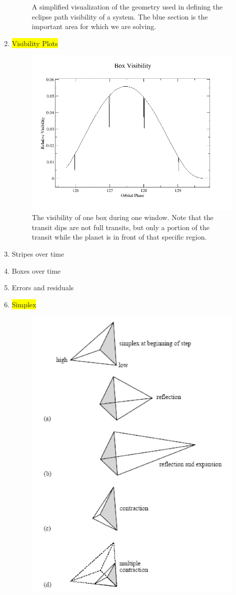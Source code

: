 \documentclass[iop]{emulateapj}
\newcommand{\hilight}[1]{\colorbox{yellow}{#1}}
\begin{document}
\begin{enumerate}
\begin{figure}[h]
				\caption{A simplified visualization of the geometry used in defining the eclipse path visibility of a system. The blue section is the important area for which we are solving.}
				\label{eclipse}
			\end{figure}
		\item \hilight{Visibility Plots}
			\begin{figure}[h]
				\centering
				\includegraphics[width=.5\textwidth]{images/box_vis.png}
				\caption{The visibility of one box during one window. Note that the transit dips are not full transits, but only a portion of the transit while the planet is in front of that specific region.}
				\label{box}
			\end{figure}
		\item Stripes over time
		\item Boxes over time
		\item Errors and residuals
		\item  \hilight{Simplex}
			\begin{figure}[h]
				\centering
				\includegraphics[width=.5\textwidth]{images/simplex.png}

\end{figure}
\end{enumerate}
\end{document}
